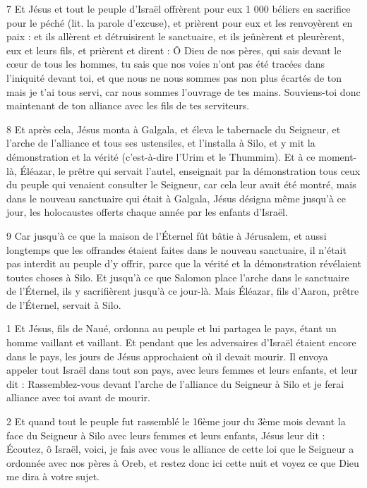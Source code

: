 \par 7 Et Jésus et tout le peuple d'Israël offrèrent pour eux 1 000 béliers en sacrifice pour le péché (lit. la parole d'excuse), et prièrent pour eux et les renvoyèrent en paix : et ils allèrent et détruisirent le sanctuaire, et ils jeûnèrent et pleurèrent, eux et leurs fils, et prièrent et dirent : Ô Dieu de nos pères, qui sais devant le cœur de tous les hommes, tu sais que nos voies n'ont pas été tracées dans l'iniquité devant toi, et que nous ne nous sommes pas non plus écartés de ton mais je t'ai tous servi, car nous sommes l'ouvrage de tes mains. Souviens-toi donc maintenant de ton alliance avec les fils de tes serviteurs.

\par 8 Et après cela, Jésus monta à Galgala, et éleva le tabernacle du Seigneur, et l'arche de l'alliance et tous ses ustensiles, et l'installa à Silo, et y mit la démonstration et la vérité (c'est-à-dire l'Urim et le Thummim). Et à ce moment-là, Éléazar, le prêtre qui servait l'autel, enseignait par la démonstration tous ceux du peuple qui venaient consulter le Seigneur, car cela leur avait été montré, mais dans le nouveau sanctuaire qui était à Galgala, Jésus désigna même jusqu'à ce jour, les holocaustes offerts chaque année par les enfants d'Israël.

\par 9 Car jusqu'à ce que la maison de l'Éternel fût bâtie à Jérusalem, et aussi longtemps que les offrandes étaient faites dans le nouveau sanctuaire, il n'était pas interdit au peuple d'y offrir, parce que la vérité et la démonstration révélaient toutes choses à Silo. Et jusqu'à ce que Salomon place l'arche dans le sanctuaire de l'Éternel, ils y sacrifièrent jusqu'à ce jour-là. Mais Éléazar, fils d'Aaron, prêtre de l'Éternel, servait à Silo.




\par 1 Et Jésus, fils de Naué, ordonna au peuple et lui partagea le pays, étant un homme vaillant et vaillant. Et pendant que les adversaires d'Israël étaient encore dans le pays, les jours de Jésus approchaient où il devait mourir. Il envoya appeler tout Israël dans tout son pays, avec leurs femmes et leurs enfants, et leur dit : Rassemblez-vous devant l'arche de l'alliance du Seigneur à Silo et je ferai alliance avec toi avant de mourir.

\par 2 Et quand tout le peuple fut rassemblé le 16ème jour du 3ème mois devant la face du Seigneur à Silo avec leurs femmes et leurs enfants, Jésus leur dit : Écoutez, ô Israël, voici, je fais avec vous le alliance de cette loi que le Seigneur a ordonnée avec nos pères à Oreb, et restez donc ici cette nuit et voyez ce que Dieu me dira à votre sujet.

